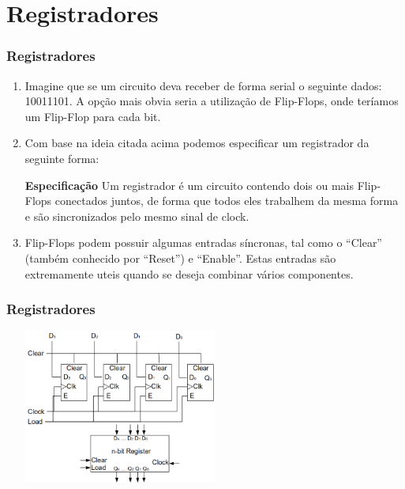 \documentclass{beamer}
\begin{document}
\section{Registradores}
\begin{frame}
  \frametitle{Registradores}
  \begin{enumerate}
   \item Imagine que se um circuito deva receber de forma serial o seguinte dados: 10011101. A opção mais obvia seria a utilização de Flip-Flops, onde 
	 teríamos um Flip-Flop para cada bit. \pause
   \item Com base na ideia citada acima podemos especificar um registrador da seguinte forma: \pause  
    \begin{block}{\textbf{Especificação}}
     Um registrador é um circuito contendo dois ou mais Flip-Flops conectados juntos, de forma que todos eles trabalhem da mesma forma e são 
	    sincronizados pelo mesmo sinal de clock.
    \end{block} \pause
 
   \item Flip-Flops podem possuir algumas entradas síncronas, tal como o “Clear” (também conhecido por “Reset”) e “Enable”. Estas entradas são extremamente 
	   uteis quando se deseja combinar vários componentes.
  \end{enumerate}
\end{frame}

\begin{frame}
  \frametitle{Registradores}
  \includegraphics[height=2in, width = 3in]{registrador_padrao.png}
\end{frame}
\end{document}
